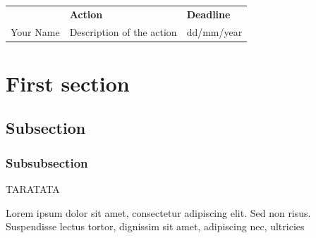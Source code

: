 \documentclass[11pt,A4]{article}
\begin{document}
\DateDiffusion{--} 

\entete
\pieddepage 
\PageDeGarde

\vspace*{2em}


 \begin{table}[!ht]
    \centering
 \begin{tabularx}{\textwidth}{>{\raggedright\arraybackslash}Y
      >{\raggedright\arraybackslash}Y   >{}Y}
    
       \\[-0.3em]  & {\bf
        Action} & {\bf Deadline} \\\hline 
    Your Name & Description of the action& dd/mm/year\\ \bottomrule
    \end{tabularx}
  \end{table}

\newpage



\section{First section}
\subsection{Subsection}
\subsubsection{Subsubsection}

TARATATA 

Lorem ipsum dolor sit amet, consectetur adipiscing elit. Sed non risus.
Suspendisse lectus tortor, dignissim sit amet, adipiscing nec, ultricies
\end{document}

